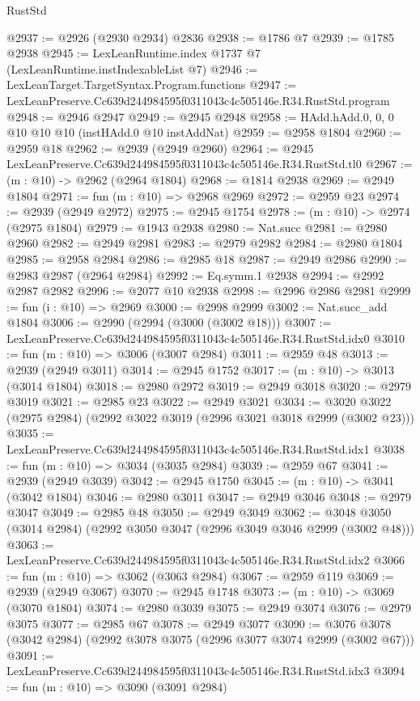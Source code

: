 \begin{lexlean}{RustStd}
\begin{coremodule}
@2937 := @2926 (@2930 @2934) @2836
@2938 := @1786 @7
@2939 := @1785 @2938
@2945 := LexLeanRuntime.index @1737 @7 (LexLeanRuntime.instIndexableList @7)
@2946 := LexLeanTarget.TargetSyntax.Program.functions
@2947 := LexLeanPreserve.Cc639d244984595f0311043c4c505146e.R34.RustStd.program
@2948 := @2946 @2947
@2949 := @2945 @2948
@2958 := HAdd.hAdd.{0, 0, 0} @10 @10 @10 (instHAdd.{0} @10 instAddNat)
@2959 := @2958 @1804
@2960 := @2959 @18
@2962 := @2939 (@2949 @2960)
@2964 := @2945 LexLeanPreserve.Cc639d244984595f0311043c4c505146e.R34.RustStd.tl0
@2967 := (m : @10) -> @2962 (@2964 @1804)
@2968 := @1814 @2938
@2969 := @2949 @1804
@2971 := fun (m : @10) => @2968 @2969
@2972 := @2959 @23
@2974 := @2939 (@2949 @2972)
@2975 := @2945 @1754
@2978 := (m : @10) -> @2974 (@2975 @1804)
@2979 := @1943 @2938
@2980 := Nat.succ
@2981 := @2980 @2960
@2982 := @2949 @2981
@2983 := @2979 @2982
@2984 := @2980 @1804
@2985 := @2958 @2984
@2986 := @2985 @18
@2987 := @2949 @2986
@2990 := @2983 @2987 (@2964 @2984)
@2992 := Eq.symm.{1} @2938
@2994 := @2992 @2987 @2982
@2996 := @2077 @10 @2938
@2998 := @2996 @2986 @2981
@2999 := fun (i : @10) => @2969
@3000 := @2998 @2999
@3002 := Nat.succ_add @1804
@3006 := @2990 (@2994 (@3000 (@3002 @18)))
@3007 := LexLeanPreserve.Cc639d244984595f0311043c4c505146e.R34.RustStd.idx0
@3010 := fun (m : @10) => @3006 (@3007 @2984)
@3011 := @2959 @48
@3013 := @2939 (@2949 @3011)
@3014 := @2945 @1752
@3017 := (m : @10) -> @3013 (@3014 @1804)
@3018 := @2980 @2972
@3019 := @2949 @3018
@3020 := @2979 @3019
@3021 := @2985 @23
@3022 := @2949 @3021
@3034 := @3020 @3022 (@2975 @2984) (@2992 @3022 @3019 (@2996 @3021 @3018 @2999 (@3002 @23)))
@3035 := LexLeanPreserve.Cc639d244984595f0311043c4c505146e.R34.RustStd.idx1
@3038 := fun (m : @10) => @3034 (@3035 @2984)
@3039 := @2959 @67
@3041 := @2939 (@2949 @3039)
@3042 := @2945 @1750
@3045 := (m : @10) -> @3041 (@3042 @1804)
@3046 := @2980 @3011
@3047 := @2949 @3046
@3048 := @2979 @3047
@3049 := @2985 @48
@3050 := @2949 @3049
@3062 := @3048 @3050 (@3014 @2984) (@2992 @3050 @3047 (@2996 @3049 @3046 @2999 (@3002 @48)))
@3063 := LexLeanPreserve.Cc639d244984595f0311043c4c505146e.R34.RustStd.idx2
@3066 := fun (m : @10) => @3062 (@3063 @2984)
@3067 := @2959 @119
@3069 := @2939 (@2949 @3067)
@3070 := @2945 @1748
@3073 := (m : @10) -> @3069 (@3070 @1804)
@3074 := @2980 @3039
@3075 := @2949 @3074
@3076 := @2979 @3075
@3077 := @2985 @67
@3078 := @2949 @3077
@3090 := @3076 @3078 (@3042 @2984) (@2992 @3078 @3075 (@2996 @3077 @3074 @2999 (@3002 @67)))
@3091 := LexLeanPreserve.Cc639d244984595f0311043c4c505146e.R34.RustStd.idx3
@3094 := fun (m : @10) => @3090 (@3091 @2984)

\end{coremodule}
\end{lexlean}
